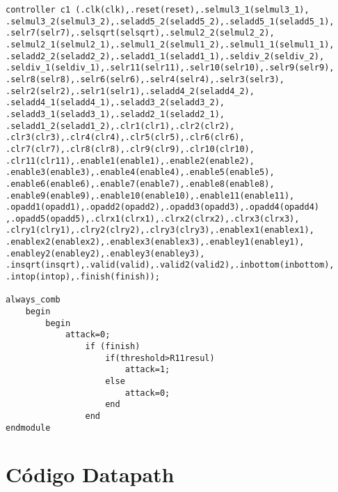 \begin{lstlisting}[style={verilog-style}]
controller c1 (.clk(clk),.reset(reset),.selmul3_1(selmul3_1),
.selmul3_2(selmul3_2),.seladd5_2(seladd5_2),.seladd5_1(seladd5_1),
.selr7(selr7),.selsqrt(selsqrt),.selmul2_2(selmul2_2),
.selmul2_1(selmul2_1),.selmul1_2(selmul1_2),.selmul1_1(selmul1_1),
.seladd2_2(seladd2_2),.seladd1_1(seladd1_1),.seldiv_2(seldiv_2),
.seldiv_1(seldiv_1),.selr11(selr11),.selr10(selr10),.selr9(selr9),
.selr8(selr8),.selr6(selr6),.selr4(selr4),.selr3(selr3),
.selr2(selr2),.selr1(selr1),.seladd4_2(seladd4_2),
.seladd4_1(seladd4_1),.seladd3_2(seladd3_2),
.seladd3_1(seladd3_1),.seladd2_1(seladd2_1),
.seladd1_2(seladd1_2),.clr1(clr1),.clr2(clr2),
.clr3(clr3),.clr4(clr4),.clr5(clr5),.clr6(clr6),
.clr7(clr7),.clr8(clr8),.clr9(clr9),.clr10(clr10),
.clr11(clr11),.enable1(enable1),.enable2(enable2),
.enable3(enable3),.enable4(enable4),.enable5(enable5),
.enable6(enable6),.enable7(enable7),.enable8(enable8),
.enable9(enable9),.enable10(enable10),.enable11(enable11),
.opadd1(opadd1),.opadd2(opadd2),.opadd3(opadd3),.opadd4(opadd4)
,.opadd5(opadd5),.clrx1(clrx1),.clrx2(clrx2),.clrx3(clrx3),
.clry1(clry1),.clry2(clry2),.clry3(clry3),.enablex1(enablex1),
.enablex2(enablex2),.enablex3(enablex3),.enabley1(enabley1),
.enabley2(enabley2),.enabley3(enabley3),
.insqrt(insqrt),.valid(valid),.valid2(valid2),.inbottom(inbottom),
.intop(intop),.finish(finish));

always_comb
	begin
		begin
			attack=0;
				if (finish)
					if(threshold>R11resul)
						attack=1;
					else
						attack=0;
					end
				end
endmodule
\end{lstlisting}

\section{Código Datapath}
\label{codedatapath}

